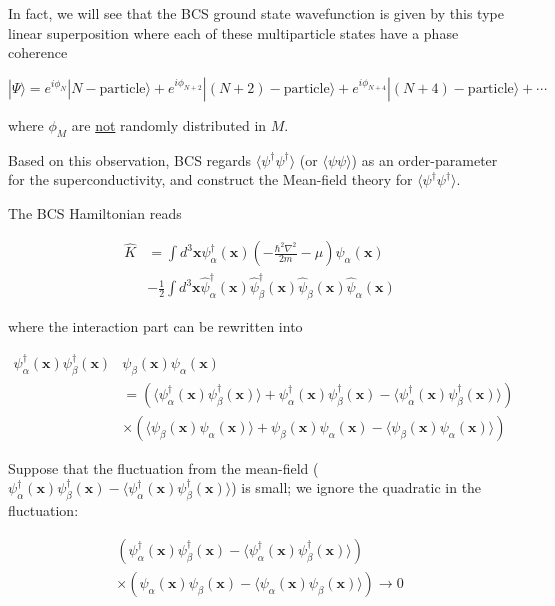 In fact, we will see that the BCS ground state wavefunction is given by this type linear superposition where each of these multiparticle states have a phase coherence

\[|\Psi\rangle = e^{i\phi_N}|N-\text{particle}\rangle + e^{i\phi_{N+2}}|(N+2)-\text{particle}\rangle + e^{i\phi_{N+4}}|(N+4)-\text{particle}\rangle + \cdots  \]

where $\phi_M$ are \uline{not} randomly distributed in $M$. 

Based on this observation, BCS regards $\langle\psi^{\dagger}\psi^{\dagger}\rangle$ (or $\langle \psi\psi\rangle$) as an order-parameter for the superconductivity, and construct the Mean-field theory for $\langle \psi^{\dagger}\psi^{\dagger}\rangle$. 

The BCS Hamiltonian reads 

\[\begin{split}\hat{K}& = \int d^3 \bm{x}\psi^{\dagger}_{\alpha}(\bm{x})\left(-\frac{\hbar^2\nabla^2}{2m} - \mu\right)\psi_{\alpha}(\bm{x})\\
&-\frac{1}{2} \int d^3\bm{x} \hat{\psi}_{\alpha}^{\dagger}(\bm{x}) \hat{\psi}_{\beta}^{\dagger}(\bm{x}) \hat{\psi}_{\beta}(\bm{x})\hat{\psi}_{\alpha}(\bm{x}) \end{split}\]

where the interaction part can be rewritten into 

\[\begin{split}\psi_{\alpha}^{\dagger}(\bm{x})\psi_{\beta}^{\dagger}(\bm{x})&\psi_{\beta}(\bm{x})\psi_{\alpha}(\bm{x})\\
 &=  \left(\langle\psi^{\dagger}_{\alpha}(\bm{x})\psi^{\dagger}_{\beta}(\bm{x})\rangle + \psi^{\dagger}_{\alpha}(\bm{x})\psi^{\dagger}_{\beta}(\bm{x}) - \langle\psi^{\dagger}_{\alpha}(\bm{x})\psi^{\dagger}_{\beta}(\bm{x})\rangle\right)\\
&\times \left(\langle\psi_{\beta}(\bm{x})\psi_{\alpha}(\bm{x})\rangle + \psi_{\beta}(\bm{x})\psi_{\alpha}(\bm{x}) - \langle\psi_{\beta}(\bm{x})\psi_{\alpha}(\bm{x})\rangle\right)
\end{split}\]

Suppose that the fluctuation from the mean-field ($\psi^{\dagger}_{\alpha}(\bm{x})\psi^{\dagger}_{\beta}(\bm{x}) - \langle\psi^{\dagger}_{\alpha}(\bm{x})\psi^{\dagger}_{\beta}(\bm{x})\rangle$) is small; we ignore the quadratic in the fluctuation: 

\[\begin{split}
\left(\psi^{\dagger}_{\alpha}(\bm{x})\psi^{\dagger}_{\beta}(\bm{x}) - \langle\psi^{\dagger}_{\alpha}(\bm{x})\psi^{\dagger}_{\beta}(\bm{x})\rangle\right)\\
\times \left(\psi_{\alpha}(\bm{x})\psi_{\beta}(\bm{x}) - \langle\psi_{\alpha}(\bm{x})\psi_{\beta}(\bm{x})\rangle\right) \rightarrow 0\end{split}\]

